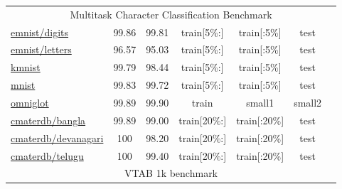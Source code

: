 \documentclass{article} \usepackage{iclr2023_conference,times}
\begin{document}
\begin{table*}[h]
\begin{tabular}{lcccccc}
\multicolumn{7}{c}{Multitask Character Classification Benchmark} \\

\href{https://www.tensorflow.org/datasets/catalog/emnist#emnistdigits}{emnist/digits}
&  99.86  &  99.81
& train[{\tiny5\%:}] & train[{\tiny:5\%}] & test
& \citep{Cohen2017EMNISTEM}
\\
\href{https://www.tensorflow.org/datasets/catalog/emnist#emnistletters}{emnist/letters}
&  96.57  &  95.03
&train[{\tiny5\%:}] & train[{\tiny:5\%}] & test
& \citep{Cohen2017EMNISTEM}
\\
\href{https://www.tensorflow.org/datasets/catalog/kmnist}{kmnist}
&  99.79  &  98.44
& train[{\tiny5\%:}] & train[{\tiny:5\%}] & test
& \citep{Clanuwat2018DeepLF}
\\
\href{https://www.tensorflow.org/datasets/catalog/mnist}{mnist}
&  99.83  &  99.72
& train[{\tiny5\%:}] & train[{\tiny:5\%}] & test
& \citep{LeCun1998GradientbasedLA}
\\
\href{https://www.tensorflow.org/datasets/catalog/omniglot}{omniglot}
&  99.89  &  99.90
& train & small1 & small2
& \citep{Lake2015HumanlevelCL}
\\
\href{https://www.tensorflow.org/datasets/catalog/cmaterdb#cmaterdbbangla_default_config}{cmaterdb/bangla}
&  99.89  &  99.00
& train[{\tiny20\%:}] & train[{\tiny:20\%}] & test
& \citep{Das2012AGA,Das2012ASF}
\\
\href{https://www.tensorflow.org/datasets/catalog/cmaterdb#cmaterdbdevanagari}{cmaterdb/devanagari}
&  100  &  98.20
& train[{\tiny20\%:}] & train[{\tiny:20\%}] & test
& \citep{Das2012AGA,Das2012ASF}
\\
\href{https://www.tensorflow.org/datasets/catalog/cmaterdb#cmaterdbtelugu}{cmaterdb/telugu}
&  100  &  99.40
& train[{\tiny20\%:}] & train[{\tiny:20\%}] & test
& \citep{Das2012AGA,Das2012ASF}
\\

\midrule

\multicolumn{7}{c}{VTAB 1k benchmark} \\


\end{tabular}
\end{table*}
\end{document}
